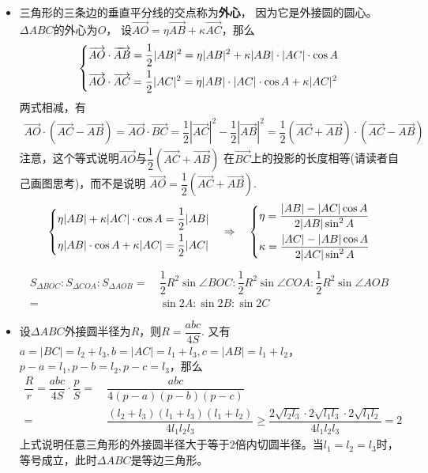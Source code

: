 \begin{itemize}[leftmargin=\inteval{\myitemleftmargin}pt,itemsep=
   \inteval{\myitemitempsep}pt,topsep=\inteval{\myitemtopsep}pt]
\item 三角形的三条边的垂直平分线的交点称为\textbf{外心}，
因为它是外接圆的圆心。$ \Delta ABC $的外心为$ O $，
设$ \vec{AO}=\eta\vec{AB}+\kappa\vec{AC} $，那么 
\begin{gather*}
\begin{dcases}
    \vec{AO}\cdot\vec{AB}=\dfrac{1}{2}|AB|^2
    =\eta |AB|^2+\kappa |AB|\cdot |AC|\cdot\cos A \\
    \vec{AO}\cdot\vec{AC}=\dfrac{1}{2}|AC|^2 
    =\eta |AB|\cdot |AC|\cdot\cos A+\kappa |AC|^2
\end{dcases}
\end{gather*}
两式相减，有
\begin{gather*}
    \vec{AO}\cdot (\vec{AC}-\vec{AB})=\vec{AO} \cdot \vec{BC}=
    \dfrac{1}{2}|\vec{AC}|^2-\dfrac{1}{2}|\vec{AB}|^2=
    \dfrac{1}{2}(\vec{AC}+\vec{AB})\cdot(\vec{AC}-\vec{AB})
\end{gather*}
注意，这个等式说明$\vec{AO}$与$\dfrac{1}{2}(\vec{AC}+\vec{AB})$
在$\vec{BC}$上的投影的长度相等(请读者自己画图思考)，而不是说明
$\vec{AO}=\dfrac{1}{2}(\vec{AC}+\vec{AB})$.
\begin{gather*}
\begin{dcases}
    \eta |AB|+\kappa |AC|\cdot\cos A=\dfrac{1}{2}|AB| \\
    \eta |AB|\cdot \cos A+\kappa |AC|=\dfrac{1}{2}|AC| 
\end{dcases}\q \Rightarrow \q
\begin{dcases}
    \eta=\dfrac{|AB|-|AC|\cos A}{2|AB|\sin^2 A} \\
    \kappa=\dfrac{|AC|-|AB|\cos A}{2|AC|\sin^2 A} 
\end{dcases}
\end{gather*}
\begin{align*}
    S_{\Delta BOC}:S_{\Delta COA}:S_{\Delta AOB} =&\ \dfrac{1}{2}R^2 
    \sin\angle BOC:\dfrac{1}{2}R^2\sin\angle COA:
    \dfrac{1}{2}R^2\sin\angle AOB \\ =&\ \sin 2A:\sin 2B:\sin 2C
\end{align*}
\item 设$ \Delta ABC $外接圆半径为$ R $，则$ R=\dfrac{abc}{4S} $. 
又有$ a=|BC|=l_2+l_3,b=|AC|=l_1+l_3,c=|AB|=l_1+l_2 $，
$ p-a=l_1,p-b=l_2,p-c=l_3 $，那么
\begin{align*}
    \dfrac{R}{r}=\dfrac{abc}{4S}\cdot \dfrac{p}{S}
    =&\ \dfrac{abc}{4(p-a)(p-b)(p-c)} \\
    =&\ \dfrac{(l_2+l_3)(l_1+l_3)(l_1+l_2)}{4l_1l_2l_3} 
    \geq \dfrac{2\sqrt{l_2l_3}\cdot 2\sqrt{l_1l_3}\cdot 2\sqrt{l_1l_2}}{4l_1l_2l_3}=2
\end{align*}
上式说明任意三角形的外接圆半径大于等于2倍内切圆半径。当$ l_1=l_2=l_3 $时，
等号成立，此时$ \Delta ABC $是等边三角形。


\end{itemize}
